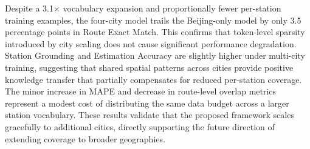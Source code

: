 \documentclass{llmxive}
\providecommand{\arraystretch}{1.05}
\begin{document}
\begin{table}[t]
\centering
\small
\setlength{\tabcolsep}{6pt}
\renewcommand{\arraystretch}{1.05}
\caption{Single-city vs.\ multi-city CPT on \textbf{Optimal Route Generation}, evaluated on the Beijing test set with 10{,}000 samples. The single-city model is trained on Beijing data only, while the multi-city model covers all four cities. Both use the same total CPT data volume and identical SFT data. $\Delta$ denotes the change from Beijing-only to four-city. $\uparrow$\,/\,$\downarrow$ indicate higher/lower is better. \textbf{Bold}: better of the two.}
\label{tab:single_city}
\end{table}

Despite a 3.1$\times$ vocabulary expansion and proportionally fewer per-station training examples, the four-city model trails the Beijing-only model by only 3.5 percentage points in Route Exact Match. This confirms that token-level sparsity introduced by city scaling does not cause significant performance degradation. Station Grounding and Estimation Accuracy are slightly higher under multi-city training, suggesting that shared spatial patterns across cities provide positive knowledge transfer that partially compensates for reduced per-station coverage. The minor increase in MAPE and decrease in route-level overlap metrics represent a modest cost of distributing the same data budget across a larger station vocabulary. These results validate that the proposed framework scales gracefully to additional cities, directly supporting the future direction of extending coverage to broader geographies.
\end{document}
